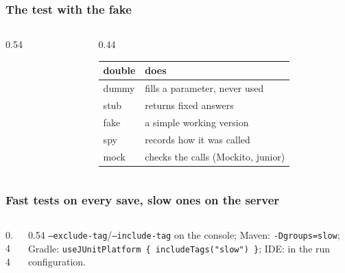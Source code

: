 \documentclass[aspectratio=169,10pt,compress]{beamer}
\begin{document}
\begin{frame}[t,fragile] \frametitle{The test with the fake}
  \begin{columns}[T]
    \begin{column}{0.54\textwidth}
    \end{column}
    \begin{column}{0.44\textwidth}
      \begin{center}\scriptsize
      \begin{tabular}{@{}ll@{}}
        \toprule
        \textbf{double} & \textbf{does} \\
        \midrule
        dummy  & fills a parameter, never used \\
        stub   & returns fixed answers \\
        fake   & a simple working version \\
        spy    & records how it was called \\
        mock   & checks the calls (Mockito, junior) \\
        \bottomrule
      \end{tabular}
      \end{center}
    \end{column}
  \end{columns}
\end{frame}





\begin{frame}[t,fragile] \frametitle{Fast tests on every save, slow ones on the server}
  \begin{columns}[T]
    \begin{column}{0.44\textwidth}
    \end{column}
    \begin{column}{0.54\textwidth}
      \small \texttt{--exclude-tag}/\texttt{--include-tag} on the console; Maven: \texttt{-Dgroups=slow}; Gradle: \texttt{useJUnitPlatform \{ includeTags("slow") \}}; IDE: in the run configuration.
    \end{column}
  \end{columns}
\end{frame}
\end{document}
